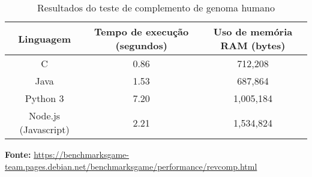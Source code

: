 \begin{table}[ht]
    \centering
    \caption{Resultados do teste de complemento de genoma humano}
    \begin{tabular}{| c | c | c |}
        \hline 
        Linguagem & Tempo de execução (segundos)
        & Uso de memória RAM (bytes) \\
        \hline
        C & 0.86 & 712,208 \\
        \hline 
        Java & 1.53 & 687,864 \\
        \hline
        Python 3 & 7.20 & 1,005,184 \\
        \hline
        Node.js (Javascript) & 2.21 & 1,534,824 \\ 
        \hline
        
    \end{tabular}
\end{table}
\textbf{Fonte:} \url{https://benchmarksgame-team.pages.debian.net/benchmarksgame/performance/revcomp.html}


\newpage